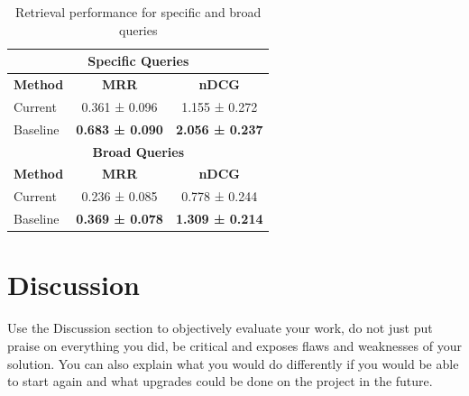 \documentclass[fleqn,moreauthors,10pt]{ds_report}
\begin{document}
\begin{table}[h]
\centering
\caption{Retrieval performance for specific and broad queries}
\begin{tabular}{l|c|c}
\toprule
\multicolumn{3}{c}{\textbf{Specific Queries}} \\
\midrule
\textbf{Method} & \textbf{MRR} & \textbf{nDCG} \\
\midrule
Current  & 0.361 ± 0.096 & 1.155 ± 0.272 \\
Baseline & \textbf{0.683 ± 0.090} & \textbf{2.056 ± 0.237} \\
\midrule[0.8pt]
\multicolumn{3}{c}{\textbf{Broad Queries}} \\
\midrule
\textbf{Method} & \textbf{MRR} & \textbf{nDCG} \\
\midrule
Current  & 0.236 ± 0.085 & 0.778 ± 0.244 \\
Baseline & \textbf{0.369 ± 0.078} & \textbf{1.309 ± 0.214} \\
\bottomrule
\end{tabular}
\end{table}






\section*{Discussion}

Use the Discussion section to objectively evaluate your work, do not just put praise on everything you did, be critical and exposes flaws and weaknesses of your solution. You can also explain what you would do differently if you would be able to start again and what upgrades could be done on the project in the future.




\end{document}
